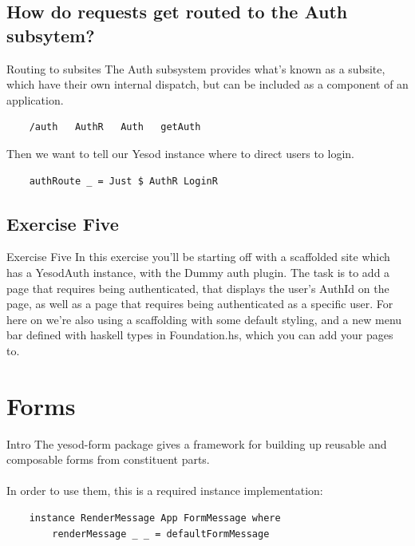 \documentclass[pdf]{beamer}
\begin{document}
\subsection{How do requests get routed to the Auth subsytem?}
\begin{frame}[fragile]{Routing to subsites}
  The Auth subsystem provides what's known as a subsite, which have
  their own internal dispatch, but can be included as a component of
  an application.
  \pause
  \begin{verbatim}
    /auth   AuthR   Auth   getAuth
  \end{verbatim}
  \pause
  Then we want to tell our Yesod instance where to direct users to login.
  \begin{verbatim}
    authRoute _ = Just $ AuthR LoginR
  \end{verbatim}
\end{frame}

\subsection{Exercise Five}
\begin{frame}{Exercise Five}
  In this exercise you'll be starting off with a scaffolded site which
  has a YesodAuth instance, with the Dummy auth plugin. The task is to
  add a page that requires being authenticated, that displays the
  user's AuthId on the page, as well as a page that requires being
  authenticated as a specific user. For here on we're also using a
  scaffolding with some default styling, and a new menu bar defined
  with haskell types in Foundation.hs, which you can add your pages
  to.
\end{frame}

\section{Forms}
\begin{frame}[fragile]{Intro}
  The yesod-form package gives a framework for building up reusable
  and composable forms from constituent parts.\\
  \\
  \pause
  In order to use them, this is a required instance implementation:
  \begin{verbatim}
    instance RenderMessage App FormMessage where
        renderMessage _ _ = defaultFormMessage
  \end{verbatim}
\end{frame}
\end{document}
